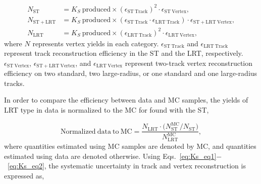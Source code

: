 \begin{align}
    N_{\mathrm{ST}}  &= K_{S}~\mathrm{produced} \times (\epsilon_{\mathrm{ST~Track}})^{2} \cdot \epsilon_{\mathrm{ST~Vertex}}, \nonumber \\
    N_{\mathrm{ST+LRT}}  &= K_{S}~\mathrm{produced} \times (\epsilon_{\mathrm{ST~Track}} \cdot \epsilon_{\mathrm{LRT~Track}}) \cdot \epsilon_{\mathrm{ST+LRT~Vertex}}, \nonumber \\
    N_{\mathrm{LRT}}&= K_{S}~\mathrm{produced} \times (\epsilon_{\mathrm{LRT~Track}})^{2} \cdot \epsilon_{\mathrm{LRT~Vertex}},
\label{eq:Ks_eq1}
\end{align}
%
where $N$ represents vertex yields in each category. $\epsilon_{\mathrm{ST~Track}}$ and $\epsilon_{\mathrm{LRT~Track}}$ represent track reconstruction efficiency in the ST and the LRT, respectively. $\epsilon_{\mathrm{ST~Vertex}}$, $\epsilon_{\mathrm{ST+LRT~Vertex}}$, and $\epsilon_{\mathrm{LRT~Vertex}}$ represent two-track vertex reconstruction efficiency on two standard, two large-radius, or one standard and one large-radius tracks.

In order to compare the efficiency between data and MC samples, the \Ks yields of LRT type in data is normalized to the MC for \Ks found with the ST,

\begin{equation}
\mathrm{Normalized~data~to~MC} = \dfrac{N_{\mathrm{LRT}} \cdot \Big(N_{\mathrm{ST}}^{\mathrm{MC}} / N_{\mathrm{ST}}\Big)}{N_{\mathrm{LRT}}^{\mathrm{MC}}},
\label{eq:Ks_eq2}
\end{equation}
%
where quantities estimated using MC samples are denoted by MC, and quantities estimated using data are denoted otherwise. Using Eqs.~\ref{eq:Ks_eq1}$-$~\ref{eq:Ks_eq2}, the systematic uncertainty in track and vertex reconstruction is expressed as,


